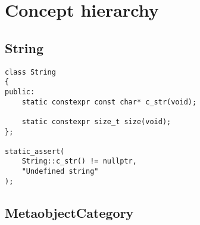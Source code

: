 \section{Concept hierarchy}
\label{appendix-concept-hierarchy}

\subsection{String}

\begin{verbatim}
class String
{
public:
	static constexpr const char* c_str(void);

	static constexpr size_t size(void);	
};

static_assert(
	String::c_str() != nullptr,
	"Undefined string"
);
\end{verbatim}

\subsection{MetaobjectCategory}

